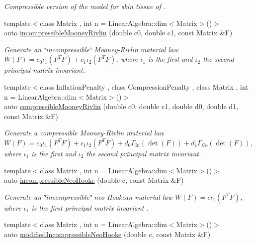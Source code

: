 \begin{DoxyCompactItemize}
\begin{DoxyCompactList}\small\item\em Compressible version of the model for skin tissue of \cite{Hendriks2005}. \end{DoxyCompactList}\item 
{\footnotesize template$<$class Matrix , int n = Linear\+Algebra\+::dim$<$\+Matrix$>$()$>$ }\\auto \hyperlink{group__Rubber_gace19173e33490aadd36ae3a03fd1d85c}{incompressible\+Mooney\+Rivlin} (double c0, double c1, const Matrix \&F)
\begin{DoxyCompactList}\small\item\em Generate an \char`\"{}incompressible\char`\"{} Mooney-\/\+Rivlin material law $ W(F)=c_0\iota_1(F^T F) + c_1\iota_2(F^T F) $, where $\iota_1$ is the first and $\iota_2$ the second principal matrix invariant. \end{DoxyCompactList}\item 
{\footnotesize template$<$class Inflation\+Penalty , class Compression\+Penalty , class Matrix , int n = Linear\+Algebra\+::dim$<$\+Matrix$>$()$>$ }\\auto \hyperlink{group__Rubber_ga9a1894daa10a0bdcc620c6c41ecb6f19}{compressible\+Mooney\+Rivlin} (double c0, double c1, double d0, double d1, const Matrix \&F)
\begin{DoxyCompactList}\small\item\em Generate a compressible Mooney-\/\+Rivlin material law $ W(F)=c_0\iota_1(F^T F) + c_1\iota_2(F^T F) + d_0\Gamma_\mathrm{In}(\det(F))+d_1\Gamma_\mathrm{Co}(\det(F)) $, where $\iota_1$ is the first and $\iota_2$ the second principal matrix invariant. \end{DoxyCompactList}\item 
{\footnotesize template$<$class Matrix , int n = Linear\+Algebra\+::dim$<$\+Matrix$>$()$>$ }\\auto \hyperlink{group__Rubber_ga5bb28aef7006413775791998936d6b81}{incompressible\+Neo\+Hooke} (double c, const Matrix \&F)
\begin{DoxyCompactList}\small\item\em Generate an \char`\"{}incompressible\char`\"{} neo-\/\+Hookean material law $ W(F)=c\iota_1(F^T F) $, where $\iota_1$ is the first principal matrix invariant . \end{DoxyCompactList}\item 
{\footnotesize template$<$class Matrix , int n = Linear\+Algebra\+::dim$<$\+Matrix$>$()$>$ }\\auto \hyperlink{group__Rubber_gaf6f5ab6a379ef03d513acc5042731a01}{modified\+Incompressible\+Neo\+Hooke} (double c, const Matrix \&F)

\end{DoxyCompactItemize}
